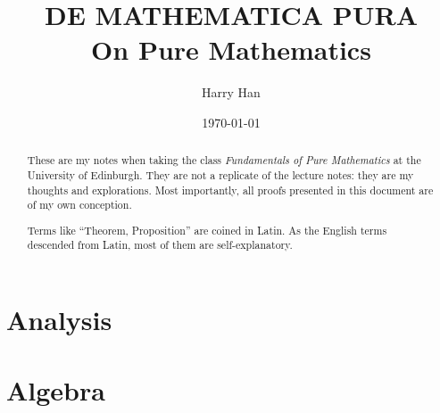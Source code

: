\documentclass[12pt, a4paper]{report}
\title{
	DE MATHEMATICA PURA \\
	\large On Pure Mathematics
}
\author{Harry Han}
\date{\today}
\theoremstyle{definition}
\theoremstyle{definition}
\theoremstyle{remark}
\begin{document}
\maketitle
\tableofcontents

\newpage

\begin{abstract}
	These are my notes when taking the class \textit{Fundamentals of Pure Mathematics} at the University of Edinburgh. They are not a replicate of the lecture notes: they are my thoughts and explorations. 
	Most importantly, all proofs presented in this document are of my own conception. 

	Terms like ``Theorem, Proposition'' are coined in Latin. As the English terms descended from Latin, most of them are self-explanatory. 
\end{abstract}

\chapter{Analysis}








\chapter{Algebra}





\appendix


\printbibliography
\end{document}
